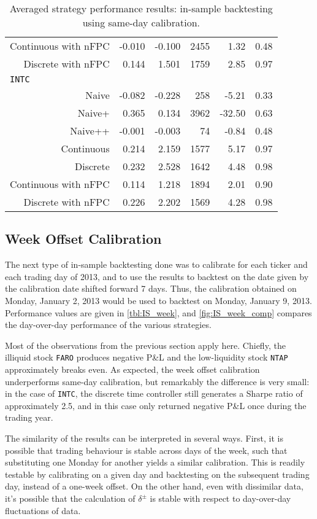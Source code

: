 \begin{table}
\begin{tabular}{@{} *{6}{r} @{}}
Continuous with nFPC & -0.010 & -0.100 & 2455 & 1.32 & 0.48 \\ 
Discrete with nFPC & 0.144 & 1.501 & 1759 & 2.85 & 0.97 \\[2ex]
\multicolumn{6}{l}{\texttt{INTC}} \\
Naive & -0.082 & -0.228 & 258 & -5.21 & 0.33 \\ 
Naive+ & 0.365 & 0.134 & 3962 & -32.50 & 0.63 \\ 
Naive++ & -0.001 & -0.003 & 74 & -0.84 & 0.48 \\ 
Continuous & 0.214 & 2.159 & 1577 & 5.17 & 0.97 \\ 
Discrete & 0.232 & 2.528 & 1642 & 4.48 & 0.98 \\ 
Continuous with nFPC & 0.114 & 1.218 & 1894 & 2.01 & 0.90 \\ 
Discrete with nFPC &  0.226 & 2.202 & 1569 & 4.28 & 0.98 \\ 
\bottomrule
\end{tabular}
\caption[In-sample backtesting performance using same-day calibration]{Averaged strategy performance results: in-sample backtesting using same-day calibration.}
\label{tbl:IS_sameday}
\end{table}

\FloatBarrier
\subsection{Week Offset Calibration}
The next type of in-sample backtesting done was to calibrate for each ticker and each trading day of 2013, and to use the results to backtest on the date given by the calibration date shifted forward 7 days. Thus, the calibration obtained on Monday, January 2, 2013 would be used to backtest on Monday, January 9, 2013. Performance values are given in \autoref{tbl:IS_week}, and \autoref{fig:IS_week_comp} compares the day-over-day performance of the various strategies. 

Most of the observations from the previous section apply here. Chiefly, the illiquid stock \texttt{FARO} produces negative P\&L and the low-liquidity stock \texttt{NTAP} approximately breaks even. As expected, the week offset calibration underperforms same-day calibration, but remarkably the difference is very small: in the case of \texttt{INTC}, the discrete time controller still generates a Sharpe ratio of approximately 2.5, and in this case only returned negative P\&L once during the trading year. 

The similarity of the results can be interpreted in several ways. First, it is possible that trading behaviour is stable across days of the week, such that substituting one Monday for another yields a similar calibration. This is readily testable by calibrating on a given day and backtesting on the subsequent trading day, instead of a one-week offset. On the other hand, even with dissimilar data, it's possible that the calculation of $\delta^\pm$ is stable with respect to day-over-day fluctuations of data.

